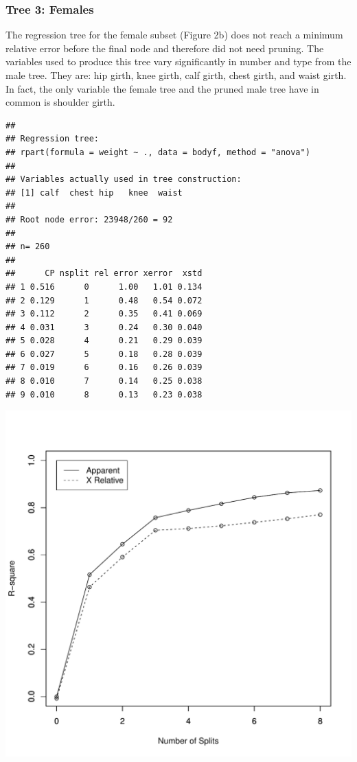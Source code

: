 \documentclass[11pt]{article}\usepackage[]{graphicx}\usepackage[]{color}
\makeatletter
\def\maxwidth{ %
  \ifdim\Gin@nat@width>\linewidth
    \linewidth
  \else
    \Gin@nat@width
  \fi
}
\newenvironment{kframe}{%
 \def\at@end@of@kframe{}%
 \ifinner\ifhmode%
  \def\at@end@of@kframe{\end{minipage}}%
  \begin{minipage}{\columnwidth}%
 \fi\fi%
 \def\FrameCommand##1{\hskip\@totalleftmargin \hskip-\fboxsep
 \colorbox{shadecolor}{##1}\hskip-\fboxsep
     \hskip-\linewidth \hskip-\@totalleftmargin \hskip\columnwidth}%
 \MakeFramed {\advance\hsize-\width
   \@totalleftmargin\z@ \linewidth\hsize
   \@setminipage}}%
 {\par\unskip\endMakeFramed%
 \at@end@of@kframe}
\newenvironment{knitrout}{}{} %
\makeatother
\begin{document}
\pagebreak

\subsubsection{Tree 3: Females} 
The regression tree for the female subset (Figure 2b) does not reach a minimum relative error before the final node and therefore did not need pruning. The variables used to produce this tree vary significantly in number and type from the male tree. They are: hip girth, knee girth, calf girth, chest girth, and waist girth. In fact, the only variable the female tree and the pruned male tree have in common is shoulder girth.

\begin{knitrout}
\color{fgcolor}\begin{kframe}
\begin{verbatim}
## 
## Regression tree:
## rpart(formula = weight ~ ., data = bodyf, method = "anova")
## 
## Variables actually used in tree construction:
## [1] calf  chest hip   knee  waist
## 
## Root node error: 23948/260 = 92
## 
## n= 260 
## 
##      CP nsplit rel error xerror  xstd
## 1 0.516      0      1.00   1.01 0.134
## 2 0.129      1      0.48   0.54 0.072
## 3 0.112      2      0.35   0.41 0.069
## 4 0.031      3      0.24   0.30 0.040
## 5 0.028      4      0.21   0.29 0.039
## 6 0.027      5      0.18   0.28 0.039
## 7 0.019      6      0.16   0.26 0.039
## 8 0.010      7      0.14   0.25 0.038
## 9 0.010      8      0.13   0.23 0.038
\end{verbatim}
\end{kframe}
\includegraphics[width=\maxwidth]{figure/rsqf1} 


\end{knitrout}
\end{document}
